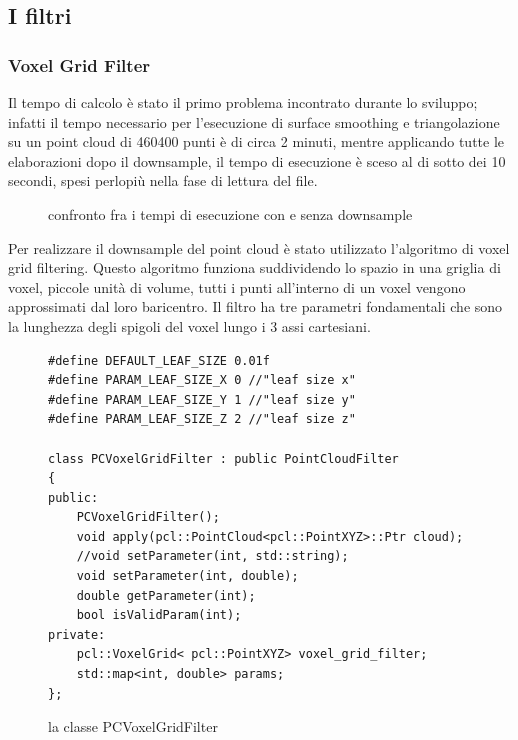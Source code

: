 \documentclass[a4paper,12pt]{article}
\begin{document}
	\subsection{I filtri}
		\subsubsection{Voxel Grid Filter}
		Il tempo di calcolo è stato il primo problema incontrato durante lo sviluppo; infatti
		il tempo necessario per l'esecuzione di surface smoothing e triangolazione su un point cloud di 460400 punti è
		di circa 2 minuti, mentre applicando tutte le elaborazioni dopo il downsample,
		il tempo di esecuzione è sceso al di sotto dei 10 secondi, spesi perlopiù nella fase di lettura del file.
		\begin{figure}[H]
    	\centering
    	\caption{confronto fra i tempi di esecuzione con e senza downsample}
    	\label{fig:time_comparison}
		\end{figure}	
		\clearpage	
		Per realizzare il downsample del point cloud è stato utilizzato l'algoritmo di voxel grid filtering.
		Questo algoritmo funziona suddividendo lo spazio in una griglia di voxel, piccole unità di volume, tutti i punti
		all'interno di un voxel vengono approssimati dal loro baricentro.
		Il filtro ha tre parametri fondamentali che sono la lunghezza degli spigoli del voxel lungo i 3 assi cartesiani.
		\begin{figure}[H]
		\begin{lstlisting}
#define DEFAULT_LEAF_SIZE 0.01f
#define PARAM_LEAF_SIZE_X 0 //"leaf size x"
#define PARAM_LEAF_SIZE_Y 1 //"leaf size y"
#define PARAM_LEAF_SIZE_Z 2 //"leaf size z"

class PCVoxelGridFilter : public PointCloudFilter
{
public:
    PCVoxelGridFilter();
    void apply(pcl::PointCloud<pcl::PointXYZ>::Ptr cloud);
    //void setParameter(int, std::string);
    void setParameter(int, double);
    double getParameter(int);
    bool isValidParam(int);
private:
    pcl::VoxelGrid< pcl::PointXYZ> voxel_grid_filter;
    std::map<int, double> params;
};
		\end{lstlisting}
		\caption{la classe PCVoxelGridFilter}
		\label{pcvoxelgridfilter}		
		\end{figure}	
\end{document}
